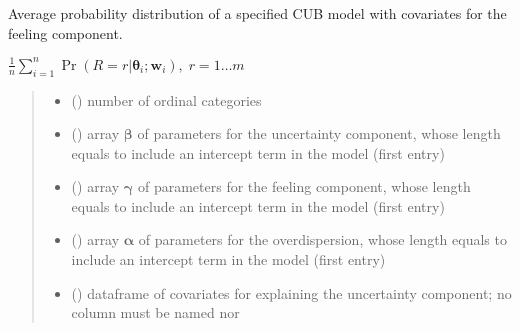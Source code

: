 \documentclass[letterpaper,10pt,english]{sphinxmanual}
\begin{document}
\begin{fulllineitems}
\label{\detokenize{cubmods:cubmods.cube_ywz.pmf}}
\pysigstartsignatures
{}
\pysigstopsignatures
\sphinxAtStartPar
Average probability distribution of a specified CUB model 
with covariates for the feeling component.

\sphinxAtStartPar
\(\frac{1}{n} \sum_{i=1}^n \Pr(R = r | \pmb\theta_i ; \pmb w_i),\; r=1 \ldots m\)
\begin{quote}\begin{description}
\begin{itemize}
\item {} 
\sphinxAtStartPar
{} () \textendash{} number of ordinal categories

\item {} 
\sphinxAtStartPar
{} () \textendash{} array \(\pmb \beta\) of parameters for the uncertainty component, whose length equals 
 to include an intercept term in the model (first entry)

\item {} 
\sphinxAtStartPar
{} () \textendash{} array \(\pmb \gamma\) of parameters for the feeling component, whose length equals 
 to include an intercept term in the model (first entry)

\item {} 
\sphinxAtStartPar
{} () \textendash{} array \(\pmb \alpha\) of parameters for the overdispersion, whose length equals 
 to include an intercept term in the model (first entry)

\item {} 
\sphinxAtStartPar
{} () \textendash{} dataframe of covariates for explaining the uncertainty component;
no column must be named  nor 


\end{itemize}
\end{description}
\end{quote}
\end{fulllineitems}
\end{document}
